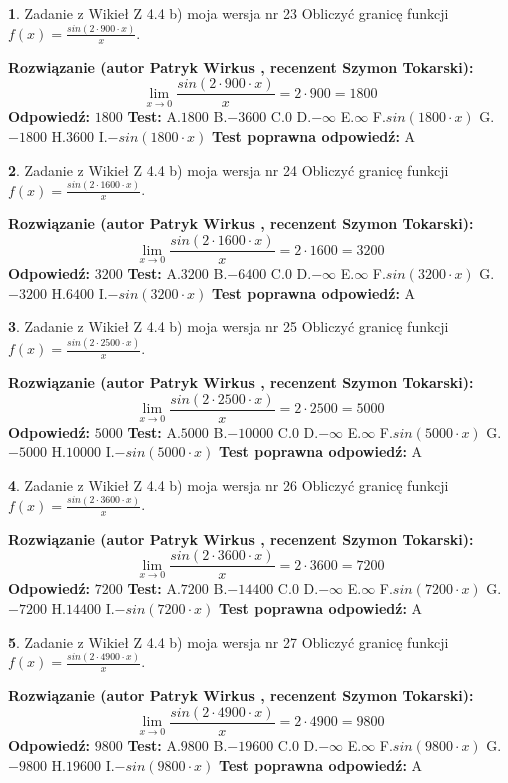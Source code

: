 \documentclass[12pt, a4paper]{article}
\theoremstyle{definition} %
\newtheorem{zad}{}
\newcommand{\zadStart}[1]{\begin{zad}#1\newline}
\newcommand{\zadStop}{\end{zad}}
\newcommand{\rozwStart}[2]{\noindent \textbf{Rozwiązanie (autor #1 , recenzent #2): }\newline}
\newcommand{\rozwStop}{\newline}
\newcommand{\odpStart}{\noindent \textbf{Odpowiedź:}\newline}
\newcommand{\odpStop}{\newline}
\newcommand{\testStart}{\noindent \textbf{Test:}\newline}
\newcommand{\testStop}{\newline}
\newcommand{\kluczStart}{\noindent \textbf{Test poprawna odpowiedź:}\newline}
\newcommand{\kluczStop}{\newline}
\begin{document}
\zadStart{Zadanie z Wikieł Z 4.4 b) moja wersja nr 23}
Obliczyć granicę funkcji $f(x)=\frac{sin(2 \cdot900\cdot x)}{x}$.
\zadStop
\rozwStart{Patryk Wirkus}{Szymon Tokarski}
$$\lim\limits_{x\to 0}\frac{sin(2 \cdot 900\cdot x)}{x}=
2 \cdot 900 = 1800$$
\rozwStop
\odpStart
$1800$
\odpStop
\testStart
A.$1800$
B.$-3600$
C.$0$
D.$-\infty$
E.$\infty$
F.$sin(1800\cdot x)$
G.$-1800$
H.$3600$
I.$-sin(1800\cdot x)$
\testStop
\kluczStart
A
\kluczStop



\zadStart{Zadanie z Wikieł Z 4.4 b) moja wersja nr 24}
Obliczyć granicę funkcji $f(x)=\frac{sin(2 \cdot1600\cdot x)}{x}$.
\zadStop
\rozwStart{Patryk Wirkus}{Szymon Tokarski}
$$\lim\limits_{x\to 0}\frac{sin(2 \cdot 1600\cdot x)}{x}=
2 \cdot 1600 = 3200$$
\rozwStop
\odpStart
$3200$
\odpStop
\testStart
A.$3200$
B.$-6400$
C.$0$
D.$-\infty$
E.$\infty$
F.$sin(3200\cdot x)$
G.$-3200$
H.$6400$
I.$-sin(3200\cdot x)$
\testStop
\kluczStart
A
\kluczStop



\zadStart{Zadanie z Wikieł Z 4.4 b) moja wersja nr 25}
Obliczyć granicę funkcji $f(x)=\frac{sin(2 \cdot2500\cdot x)}{x}$.
\zadStop
\rozwStart{Patryk Wirkus}{Szymon Tokarski}
$$\lim\limits_{x\to 0}\frac{sin(2 \cdot 2500\cdot x)}{x}=
2 \cdot 2500 = 5000$$
\rozwStop
\odpStart
$5000$
\odpStop
\testStart
A.$5000$
B.$-10000$
C.$0$
D.$-\infty$
E.$\infty$
F.$sin(5000\cdot x)$
G.$-5000$
H.$10000$
I.$-sin(5000\cdot x)$
\testStop
\kluczStart
A
\kluczStop



\zadStart{Zadanie z Wikieł Z 4.4 b) moja wersja nr 26}
Obliczyć granicę funkcji $f(x)=\frac{sin(2 \cdot3600\cdot x)}{x}$.
\zadStop
\rozwStart{Patryk Wirkus}{Szymon Tokarski}
$$\lim\limits_{x\to 0}\frac{sin(2 \cdot 3600\cdot x)}{x}=
2 \cdot 3600 = 7200$$
\rozwStop
\odpStart
$7200$
\odpStop
\testStart
A.$7200$
B.$-14400$
C.$0$
D.$-\infty$
E.$\infty$
F.$sin(7200\cdot x)$
G.$-7200$
H.$14400$
I.$-sin(7200\cdot x)$
\testStop
\kluczStart
A
\kluczStop



\zadStart{Zadanie z Wikieł Z 4.4 b) moja wersja nr 27}
Obliczyć granicę funkcji $f(x)=\frac{sin(2 \cdot4900\cdot x)}{x}$.
\zadStop
\rozwStart{Patryk Wirkus}{Szymon Tokarski}
$$\lim\limits_{x\to 0}\frac{sin(2 \cdot 4900\cdot x)}{x}=
2 \cdot 4900 = 9800$$
\rozwStop
\odpStart
$9800$
\odpStop
\testStart
A.$9800$
B.$-19600$
C.$0$
D.$-\infty$
E.$\infty$
F.$sin(9800\cdot x)$
G.$-9800$
H.$19600$
I.$-sin(9800\cdot x)$
\testStop
\kluczStart
A
\kluczStop
\end{document}
